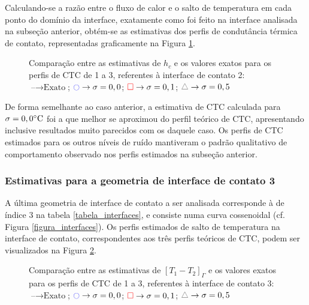 Calculando-se a razão entre o fluxo de calor e o salto de temperatura em cada ponto do domínio da interface, exatamente como foi feito na interface analisada na subseção anterior, obtém-se as estimativas dos perfis de condutância térmica de contato, representadas graficamente na Figura \ref{figura_ctc_interface_02}.
\begin{figure}[H]
	\caption{Comparação entre as estimativas de $h_c$ e os valores exatos para os perfis de CTC de 1 a 3, referentes à interface de contato 2: $\text{--} \rightarrow \text{Exato}$; $\textcolor{blue}{\ocircle} \rightarrow \sigma = 0,0$; $\textcolor{red}{\square} \rightarrow \sigma = 0,1$; $\textcolor{gray}{\triangle} \rightarrow \sigma = 0,5$}
	\label{figura_ctc_interface_02}
\end{figure}

De forma semelhante ao caso anterior, a estimativa de CTC calculada para $\sigma = 0,0\celsius$ foi a que melhor se aproximou do perfil teórico de CTC, apresentando inclusive resultados muito parecidos com os daquele caso. Os perfis de CTC estimados para os outros níveis de ruído mantiveram o padrão qualitativo de comportamento observado nos perfis estimados na subseção anterior.


%
%
\subsubsection{Estimativas para a geometria de interface de contato 3}

A última geometria de interface de contato a ser analisada corresponde à de índice 3 na tabela \ref{tabela_interfaces}, e consiste numa curva cossenoidal (cf. Figura \ref{figura_interfaces}).  Os perfis estimados de salto de temperatura na interface de contato, correspondentes aos três perfis teóricos de CTC, podem ser visualizados na Figura \ref{figura_delta_temperaturas_interface_03}.

\begin{figure}[H]
	\caption{Comparação entre as estimativas de $[T_1 - T_2]_\Gamma$ e os valores exatos para os perfis de CTC de 1 a 3, referentes à interface de contato 3: $\text{--} \rightarrow \text{Exato}$; $\textcolor{blue}{\ocircle} \rightarrow \sigma = 0,0$; $\textcolor{red}{\square} \rightarrow \sigma = 0,1$; $\textcolor{gray}{\triangle} \rightarrow \sigma = 0,5$}
	\label{figura_delta_temperaturas_interface_03}
\end{figure}

